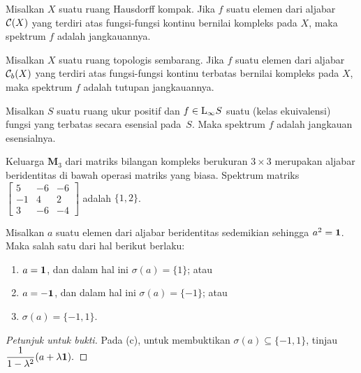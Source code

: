 \begin{exam}\label{0005712} Misalkan $X$ suatu ruang Hausdorff kompak. Jika $f$ suatu elemen
dari aljabar $\mathcal{C}(X)$ yang terdiri atas fungsi-fungsi kontinu bernilai kompleks pada $X$, maka
spektrum $f$ adalah jangkauannya.
\end{exam}

\begin{exam} Misalkan $X$ suatu ruang topologis sembarang. Jika $f$ suatu elemen dari
aljabar $\mathcal{C}_b(X)$ yang terdiri atas fungsi-fungsi kontinu terbatas bernilai kompleks pada $X$, maka
spektrum $f$ adalah tutupan jangkauannya.
\end{exam}

\begin{exam} Misalkan $S$ suatu ruang ukur positif dan $f \in \mathrm{L_{\infty}}{S}$ suatu
(kelas ekuivalensi) fungsi yang terbatas secara esensial pada~$S$. Maka
spektrum $f$ adalah jangkauan esensialnya.
\end{exam}

\begin{exam} Keluarga $\mathbf M_3$ dari matriks bilangan kompleks berukuran $3 \times 3$ merupakan aljabar
beridentitas di bawah operasi matriks yang biasa. Spektrum matriks $\begin{bmatrix} 5
& -6 & -6 \\ -1 & 4 & 2 \\ 3 & -6 & -4 \end{bmatrix}$ adalah $\{1,2\}$.
\end{exam}

\begin{prop} Misalkan $a$ suatu elemen dari aljabar beridentitas sedemikian sehingga $a^2 = \mathbf{1}$.
Maka salah satu dari hal berikut berlaku:
 \begin{enumerate}[label=\rm{(\alph*)}]
  \item $a = \mathbf{1}$, dan dalam hal ini $\sigma(a) = \{1\}$; atau
  \item $a = -\mathbf{1}$, dan dalam hal ini $\sigma(a) = \{-1\}$; atau
  \item $\sigma(a) = \{-1,1\}$.
 \end{enumerate}
\end{prop}

\begin{proof}[\emph{Petunjuk untuk bukti}] Pada (c), untuk membuktikan $\sigma(a) \subseteq \{-1,1\}$,
tinjau $\displaystyle\frac1{1 - \lambda^2}(a + \lambda \mathbf 1).$  \ns
\end{proof}

